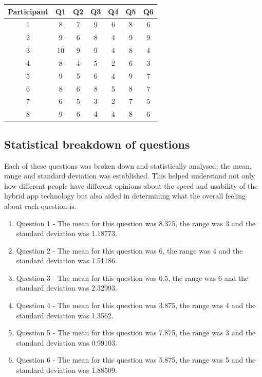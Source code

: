 \begin{center} 
 \begin{tabular}{||c c c c c c c||}  
 \hline
  \hline
 Participant & Q1 & Q2 & Q3 & Q4 & Q5 & Q6 \\
 \hline
 1 & 8 & 7 & 9 & 6 & 8 & 6 \\
 \hline
 2 & 9 & 6 & 8 & 4 & 9 & 9 \\
 \hline
 3 & 10 & 9 & 9 & 4 & 8 & 4 \\
 \hline
 4 & 8 & 4 & 5 & 2 & 6 & 3 \\
 \hline
 5 & 9 & 5 & 6 & 4 & 9 & 7 \\
 \hline
 6 & 8 & 6 & 8 & 5 & 8 & 7 \\
 \hline
 7 & 6 & 5 & 3 & 2 & 7 & 5 \\ 
 \hline
 8 & 9 & 6 & 4 & 4 & 8 & 6 \\
\hline
\hline
 \end{tabular}
 \end{center}

 \subsection{Statistical breakdown of questions}
 Each of these questions was broken down and statistically analysed; the mean, range and standard deviation was established. This helped understand not only how different people have different opinions about the speed and usability of the hybrid app technology but also aided in determining what the overall feeling about each question is.
 \begin{enumerate}
  \item Question 1 - The mean for this question was 8.375, the range was 3 and the standard deviation was 1.18773.
  \item Question 2 - The mean for this question was 6, the range was 4 and the standard deviation was 1.51186.
  \item Question 3 - The mean for this question was 6.5, the range was 6 and the standard deviation was 2.32993.
  \item Question 4 - The mean for this question was 3.875, the range was 4 and the standard deviation was 1.3562.
  \item Question 5 - The mean for this question was 7.875, the range was 3 and the standard deviation was 0.99103.
  \item Question 6 - The mean for this question was 5.875, the range was 5 and the standard deviation was 1.88509.
\end{enumerate}

